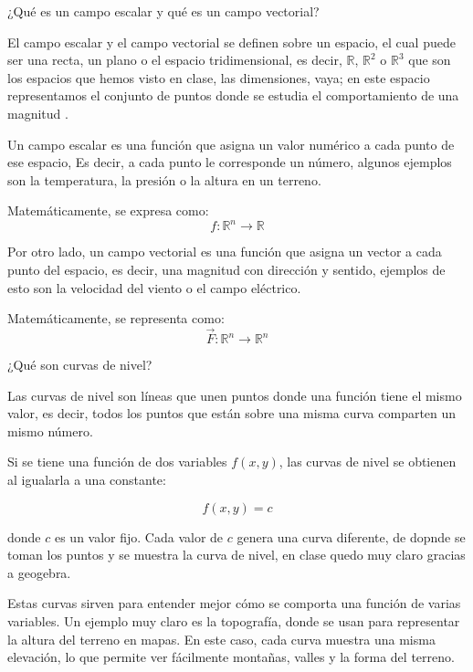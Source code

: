  ¿Qué es un campo escalar y qué es un campo vectorial?

\begin{respuesta}
El campo escalar y el campo vectorial se definen sobre un espacio, el cual puede ser una recta, un plano o el espacio tridimensional, es decir, $\mathbb{R}$, $\mathbb{R}^2$ o $\mathbb{R}^3$ que son los espacios que hemos visto en clase, las dimensiones, vaya; en este espacio representamos el conjunto de puntos donde se estudia el comportamiento de una magnitud .

Un campo escalar es una función que asigna un valor numérico a cada punto de ese espacio, Es decir, a cada punto le corresponde un número, algunos ejemplos son la temperatura, la presión o la altura en un terreno.

Matemáticamente, se expresa como:
\[
f: \mathbb{R}^n \rightarrow \mathbb{R}
\]

Por otro lado, un campo vectorial es una función que asigna un vector a cada punto del espacio, es decir, una magnitud con dirección y sentido, ejemplos de esto son la velocidad del viento o el campo eléctrico.

Matemáticamente, se representa como:
\[
\vec{F}: \mathbb{R}^n \rightarrow \mathbb{R}^n
\]
    \vspace{5cm}
\end{respuesta}

 ¿Qué son curvas de nivel?

\begin{respuesta}
Las curvas de nivel son líneas que unen puntos donde una función tiene el mismo valor, es decir, todos los puntos que están sobre una misma curva comparten un mismo número.

Si se tiene una función de dos variables $f(x,y)$, las curvas de nivel se obtienen al igualarla a una constante:

\[
f(x,y) = c
\]

donde $c$ es un valor fijo. Cada valor de $c$ genera una curva diferente, de dopnde se toman los puntos y se muestra la curva de nivel, en clase quedo muy claro gracias a geogebra.

Estas curvas sirven para entender mejor cómo se comporta una función de varias variables. Un ejemplo muy claro es la topografía, donde se usan para representar la altura del terreno en mapas. En este caso, cada curva muestra una misma elevación, lo que permite ver fácilmente montañas, valles y la forma del terreno.
    \vspace{5cm}
\end{respuesta}

